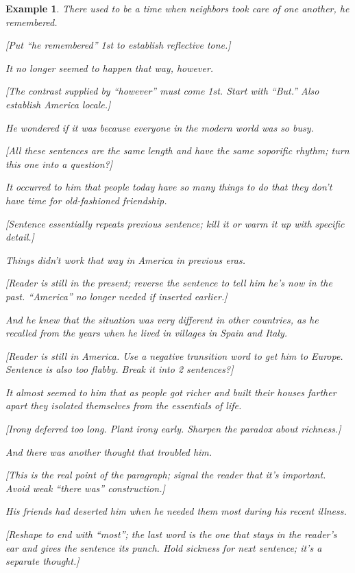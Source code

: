 \documentclass{book}
\numberwithin{equation}{section}
\newtheorem{example}{Example}[chapter]
\begin{document}
\begin{example}
    There used to be a time when neighbors took care of one another, he remembered.
    
    \emph{[Put ``he remembered'' 1st to establish reflective tone.]}
    
    It no longer seemed to happen that way, however.
    
    \emph{[The contrast supplied by ``however'' must come 1st. Start with ``But.'' Also establish America locale.]}
    
    He wondered if it was because everyone in the modern world was so busy.
    
    \emph{[All these sentences are the same length and have the same soporific rhythm; turn this one into a question?]}
    
    It occurred to him that people today have so many things to do that they don't have time for old-fashioned friendship.
    
    \emph{[Sentence essentially repeats previous sentence; kill it or warm it up with specific detail.]}
    
    Things didn't work that way in America in previous eras.
    
    \emph{[Reader is still in the present; reverse the sentence to tell him he's now in the past. ``America'' no longer needed if inserted earlier.]}
    
    And he knew that the situation was very different in other countries, as he recalled from the years when he lived in villages in Spain and Italy.
    
    \emph{[Reader is still in America. Use a negative transition word to get him to Europe. Sentence is also too flabby. Break it into 2 sentences?]}
    
    It almost seemed to him that as people got richer and built their houses farther apart they isolated themselves from the essentials of life.
    
    \emph{[Irony deferred too long. Plant irony early. Sharpen the paradox about richness.]}
    
    And there was another thought that troubled him.
    
    \emph{[This is the real point of the paragraph; signal the reader that it's important. Avoid weak ``there was'' construction.]}
    
    His friends had deserted him when he needed them most during his recent illness.
    
    \emph{[Reshape to end with ``most''; the last word is the one that stays in the reader's ear and gives the sentence its punch. Hold sickness for next sentence; it's a separate thought.]}
    

\end{example}
\end{document}
